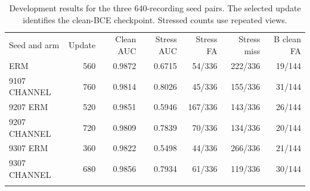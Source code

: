 \begin{table}[t]
\centering
\small
\caption{Development results for the three 640-recording seed pairs. The selected update identifies the clean-BCE checkpoint. Stressed counts use repeated views.}\label{tab:development}
\begin{tabular}{@{}lrrrrrr@{}}
\toprule
Seed and arm & Update & Clean AUC & Stress AUC & Stress FA & Stress miss & B clean FA \\
\colrule
9107 ERM & 560 & 0.9872 & 0.6715 & 54/336 & 222/336 & 19/144 \\
9107 CHANNEL & 760 & 0.9814 & 0.8026 & 45/336 & 155/336 & 31/144 \\
9207 ERM & 520 & 0.9851 & 0.5946 & 167/336 & 143/336 & 26/144 \\
9207 CHANNEL & 720 & 0.9809 & 0.7839 & 70/336 & 134/336 & 20/144 \\
9307 ERM & 360 & 0.9822 & 0.5498 & 44/336 & 266/336 & 21/144 \\
9307 CHANNEL & 680 & 0.9856 & 0.7934 & 61/336 & 119/336 & 30/144 \\
\botrule
\end{tabular}
\end{table}
